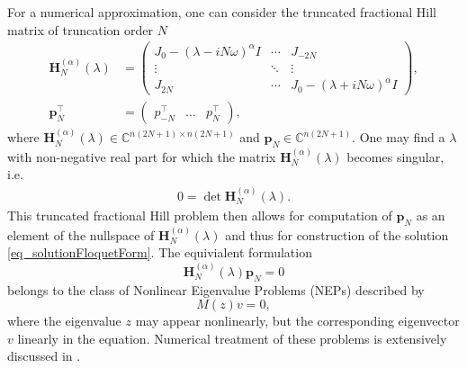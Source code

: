 \documentclass{svproc}
\newcommand{\pVec}{\mathbf p}
\newcommand{\hMat}{\mathbf H}
\begin{document}
{{%
		\begin{remark}
		For a numerical approximation, one can consider the truncated fractional Hill matrix of truncation order $N$
		\begin{align}\label{eq_FractionalHillMatTruncated}
			\hMat_{N}^{(\alpha)}(\lambda) &= \begin{pmatrix}
				J_0 - (\lambda -iN\omega)^\alpha I & \cdots & J_{-2N}\\
				\vdots & \ddots & \vdots \\
				J_{2N} & \cdots & J_0 - (\lambda +iN\omega)^\alpha I
			\end{pmatrix},\\
			\pVec_N^\top &= \begin{pmatrix}
				p_{-N}^\top &\dots &p_{N}^\top
			\end{pmatrix},
		\end{align}where $\hMat_{N}^{(\alpha)}(\lambda)\in \mathbb C^{n(2N+1)\times n(2N+1)}$ and $\pVec_N\in \mathbb C^{n(2N+1)}$. One may find a $\lambda$ with non-negative real part for which the matrix $\hMat_N^{(\alpha)}(\lambda)$ becomes singular, i.e.
		\begin{align}\label{eq_fractionalHillProblem}
			0 = \det \hMat_{N}^{(\alpha)}(\lambda).
		\end{align} This truncated fractional Hill problem then allows for computation of $\pVec_N$ as an element of the nullspace of $\hMat_{N}^{(\alpha)}(\lambda)$ and thus for construction of the solution \eqref{eq_solutionFloquetForm}. The equivialent formulation
		\begin{equation}
		\hMat_{N}^{(\alpha)}(\lambda) \pVec_N = 0
		\end{equation}
		belongs to the class of Nonlinear Eigenvalue Problems (NEPs)  described by \cite{Guettel2017}
		\begin{equation}
		M(z)v=0,
		\end{equation}
		where the eigenvalue $z$ may appear nonlinearly, but the corresponding eigenvector $v$ linearly in the equation. Numerical treatment of these problems is extensively discussed in \cite{Guettel2017}.
	\end{remark}}

}
\end{document}
